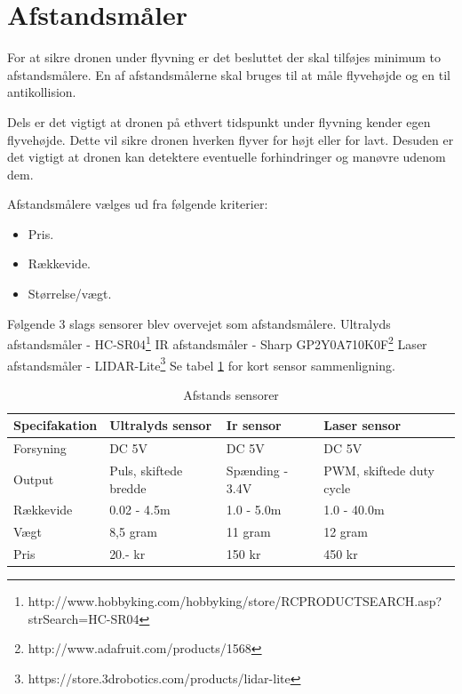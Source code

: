 \section{Afstandsmåler}

For at sikre dronen under flyvning er det besluttet der skal tilføjes minimum to afstandsmålere. En af afstandsmålerne skal bruges til at måle flyvehøjde og en til antikollision.

Dels er det vigtigt at dronen på ethvert tidspunkt under flyvning kender egen flyvehøjde. Dette vil sikre dronen hverken flyver for højt eller for lavt. Desuden er det vigtigt at dronen kan detektere eventuelle forhindringer og manøvre udenom dem.

Afstandsmålere vælges ud fra følgende kriterier:  
\begin{itemize}
	\item Pris.
	\item Rækkevide. 
	\item Størrelse/vægt. 
\end{itemize}

\vspace{0.5cm}

Følgende 3 slags sensorer blev overvejet som afstandsmålere. 
\newline Ultralyds afstandsmåler - HC-SR04\footnote{http://www.hobbyking.com/hobbyking/store/RC\textunderscore PRODUCT\textunderscore SEARCH.asp?strSearch=HC-SR04}  
\newline IR afstandsmåler - Sharp GP2Y0A710K0F\footnote{http://www.adafruit.com/products/1568}  \newline Laser afstandsmåler - LIDAR-Lite\footnote{https://store.3drobotics.com/products/lidar-lite}  \newline Se tabel \ref{tab:Afstands_sensorer} for kort sensor sammenligning.

\begin{table}[H]
	\centering
		\begin{tabular}{|p{2.8cm}|p{3.4 cm}|p{3.4 cm}|p{3.4 cm}|} 
		\hline
			\textbf{Specifakation} 	& \textbf{Ultralyds sensor} 	& \textbf{Ir sensor} 		& \textbf{Laser sensor} \\ \hline
			 Forsyning 				& DC 5V 						& DC 5V 					& DC 5V \\ \hline			 
			 Output 				& Puls, \newline skiftede bredde 		& Spænding \newline 1.4 - 3.4V 		& PWM, \newline skiftede duty cycle\\ \hline
			 Rækkevide 					& 0.02 - 4.5m 					& 1.0 - 5.0m 				& 1.0 - 40.0m \\ \hline
			 Vægt 					& 8,5 gram 						& 11 gram 					& 12 gram \\ \hline
		 	 Pris 					& 20.- kr 						& 150 kr 					& 450 kr \\ \hline			 
		\end{tabular}
	\caption{Afstands sensorer}
	\label{tab:Afstands_sensorer}
\end{table}


